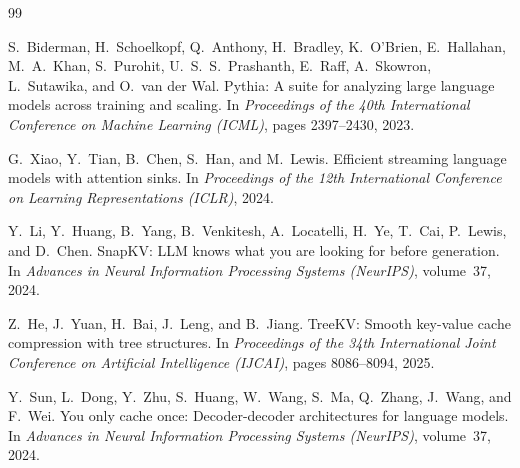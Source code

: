 \documentclass{article}
\begin{document}
\begin{thebibliography}{99}
\small

S.~Biderman, H.~Schoelkopf, Q.~Anthony, H.~Bradley, K.~O'Brien, E.~Hallahan, M.~A.~Khan, S.~Purohit, U.~S.~S.~Prashanth, E.~Raff, A.~Skowron, L.~Sutawika, and O.~van der Wal.
\newblock Pythia: A suite for analyzing large language models across training and scaling.
\newblock In \textit{Proceedings of the 40th International Conference on Machine Learning (ICML)}, pages 2397--2430, 2023.

G.~Xiao, Y.~Tian, B.~Chen, S.~Han, and M.~Lewis.
\newblock Efficient streaming language models with attention sinks.
\newblock In \textit{Proceedings of the 12th International Conference on Learning Representations (ICLR)}, 2024.

Y.~Li, Y.~Huang, B.~Yang, B.~Venkitesh, A.~Locatelli, H.~Ye, T.~Cai, P.~Lewis, and D.~Chen.
\newblock SnapKV: LLM knows what you are looking for before generation.
\newblock In \textit{Advances in Neural Information Processing Systems (NeurIPS)}, volume~37, 2024.

Z.~He, J.~Yuan, H.~Bai, J.~Leng, and B.~Jiang.
\newblock TreeKV: Smooth key-value cache compression with tree structures.
\newblock In \textit{Proceedings of the 34th International Joint Conference on Artificial Intelligence (IJCAI)}, pages 8086--8094, 2025.

Y.~Sun, L.~Dong, Y.~Zhu, S.~Huang, W.~Wang, S.~Ma, Q.~Zhang, J.~Wang, and F.~Wei.
\newblock You only cache once: Decoder-decoder architectures for language models.
\newblock In \textit{Advances in Neural Information Processing Systems (NeurIPS)}, volume~37, 2024.

\end{thebibliography}
\end{document}
